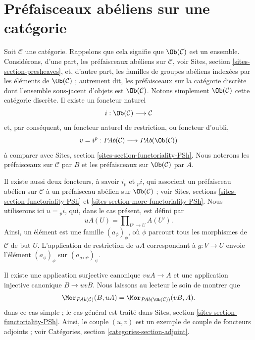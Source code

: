 \section{Préfaisceaux abéliens sur une catégorie}
\label{section-injectives-presheaves}

\noindent
Soit $\mathcal{C}$ une catégorie. Rappelons que cela signifie que
$\Ob(\mathcal{C})$ est un ensemble. Considérons, d'une part, les préfaisceaux
abéliens sur $\mathcal{C}$, voir Sites, section
\ref{sites-section-presheaves}, et, d'autre part, les familles de groupes
abéliens indexées par les éléments de $\Ob(\mathcal{C})$ ; autrement dit, les
préfaisceaux sur la catégorie discrète dont l'ensemble sous-jacent d'objets est
$\Ob(\mathcal{C})$. Notons simplement $\Ob(\mathcal{C})$ cette catégorie
discrète. Il existe un foncteur naturel
$$
i : \Ob(\mathcal{C}) \longrightarrow \mathcal{C}
$$
et, par conséquent, un foncteur naturel de restriction, ou foncteur d'oubli,
$$
v = i^p :
\textit{PAb}(\mathcal{C})
\longrightarrow
\textit{PAb}(\Ob(\mathcal{C}))
$$
à comparer avec Sites, section \ref{sites-section-functoriality-PSh}. Nous
noterons les préfaisceaux sur $\mathcal{C}$ par $B$ et les préfaisceaux sur
$\Ob(\mathcal{C})$ par $A$.

\medskip\noindent
Il existe aussi deux foncteurs, à savoir $i_p$ et ${}_pi$, qui associent un
préfaisceau abélien sur $\mathcal{C}$ à un préfaisceau abélien sur
$\Ob(\mathcal{C})$ ; voir Sites, sections
\ref{sites-section-functoriality-PSh} et
\ref{sites-section-more-functoriality-PSh}. Nous utiliserons ici
$u = {}_pi$, qui, dans le cas présent, est défini par
$$
uA(U) = \prod\nolimits_{U' \to U} A(U').
$$
Ainsi, un élément est une famille $(a_\phi)_\phi$, où $\phi$ parcourt tous les
morphismes de $\mathcal{C}$ de but $U$. L'application de restriction de $uA$
correspondant à $g : V \to U$ envoie l'élément $(a_\phi)_\phi$ sur
$(a_{g \circ \psi})_\psi$.

\medskip\noindent
Il existe une application surjective canonique $vuA \to A$ et une application
injective canonique $B \to uvB$. Nous laissons au lecteur le soin de montrer
que
$$
\Mor_{\textit{PAb}(\mathcal{C})}(B, uA)
=
\Mor_{\textit{PAb}(\Ob(\mathcal{C}))}(vB, A).
$$
dans ce cas simple ; le cas général est traité dans Sites, section
\ref{sites-section-functoriality-PSh}. Ainsi, le couple $(u, v)$ est un exemple
de couple de foncteurs adjoints ; voir Catégories, section
\ref{categories-section-adjoint}.

